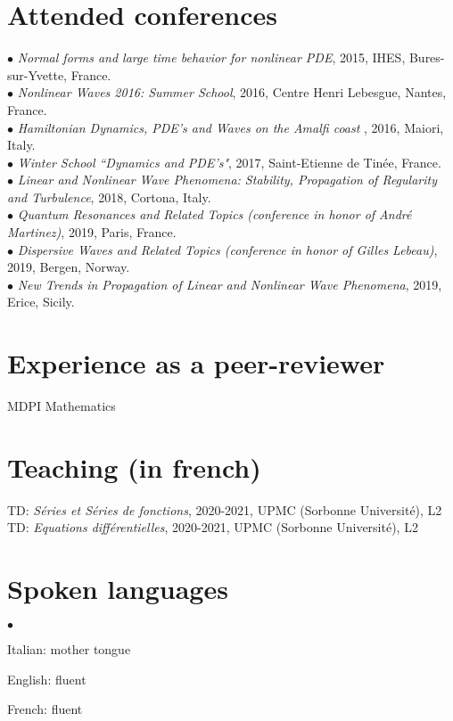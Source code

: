 \documentclass[margin,line,pifont,palatino,courier]{res}
\newenvironment{list2}{
  \begin{list}{$\bullet$}{%
      \setlength{\itemsep}{0in}
      \setlength{\parsep}{0in} \setlength{\parskip}{0in}
      \setlength{\topsep}{0in} \setlength{\partopsep}{0in}
      \setlength{\leftmargin}{0.2in}}}{\end{list}}
\begin{document}
\begin{resume}
\section{\sc Attended conferences \\}
 $\bullet$ \emph{Normal forms and large time behavior for nonlinear PDE}, 2015, IHES, Bures-sur-Yvette, France.  \\
 $\bullet$  \emph{Nonlinear Waves 2016: Summer School}, 2016, Centre Henri Lebesgue, Nantes, France.  \\
$\bullet$ \emph{Hamiltonian Dynamics, PDE's and Waves on the Amalfi coast
}, 2016, Maiori, Italy. \\
$\bullet$ \emph{Winter School ``Dynamics and PDE's"}, 2017, Saint-Etienne de Tin\'ee, France. \\
$\bullet$ \emph{Linear and Nonlinear Wave Phenomena: Stability, Propagation of Regularity and Turbulence}, 2018, Cortona, Italy.\\
$\bullet$ \emph{Quantum Resonances and Related Topics (conference in honor of Andr\'e Martinez)}, 2019, Paris, France. \\
$\bullet$ \emph{Dispersive Waves and Related Topics (conference in honor of Gilles Lebeau)}, 2019, Bergen, Norway.\\
$\bullet$ \emph{New Trends in Propagation of Linear and Nonlinear Wave Phenomena}, 2019, Erice, Sicily. \\

\section{\sc Experience as a peer-reviewer} MDPI Mathematics

\section{\sc Teaching (in french)}  TD: \emph{S\'eries et S\'eries de fonctions}, 2020-2021, UPMC (Sorbonne Universit\'e), L2\\
TD: \emph{Equations diff\'erentielles}, 2020-2021, UPMC (Sorbonne Universit\'e), L2


\section{\sc Spoken languages} \begin{list2}
\vspace*{.05in}
\item  Italian: mother tongue
\item English: fluent
\item French: fluent
\end{list2}




\end{resume}
\end{document}
